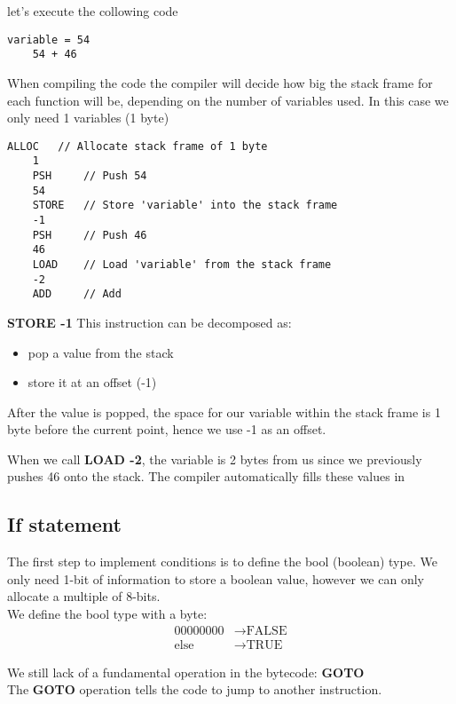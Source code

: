 \documentclass[../documentation.tex]{subfiles}
\begin{document}
let's execute the collowing code

\begin{lstlisting}[style=generic]
    variable = 54
    54 + 46
\end{lstlisting}

When compiling the code the compiler will decide how big the stack frame for each function will be,
depending on the number of variables used. In this case we only need 1 variables (1 byte)

\begin{lstlisting}[style=generic]
    ALLOC   // Allocate stack frame of 1 byte
    1
    PSH     // Push 54
    54
    STORE   // Store 'variable' into the stack frame
    -1
    PSH     // Push 46
    46
    LOAD    // Load 'variable' from the stack frame
    -2
    ADD     // Add
\end{lstlisting}

\textbf{STORE -1}
This instruction can be decomposed as:

\begin{itemize}
    \item pop a value from the stack
    \item store it at an offset (-1)
\end{itemize}

After the value is popped, the space for our variable within the stack frame is 1 byte before the current point,
hence we use -1 as an offset.

When we call \textbf{LOAD -2}, the variable is 2 bytes from us since we previously pushes 46 onto the stack.
The compiler automatically fills these values in

\subsection{If statement}

The first step to implement conditions is to define the bool (boolean) type. We only need 1-bit of information
to store a boolean value, however we can only allocate a multiple of 8-bits.
\\
We define the bool type with a byte:
\begin{align*}
    00000000 &\rightarrow \text{FALSE} \\
    \text{else} &\rightarrow \text{TRUE}
\end{align*}

We still lack of a fundamental operation in the bytecode: \textbf{GOTO}
\\
The \textbf{GOTO} operation tells the code to jump to another instruction.
\end{document}

